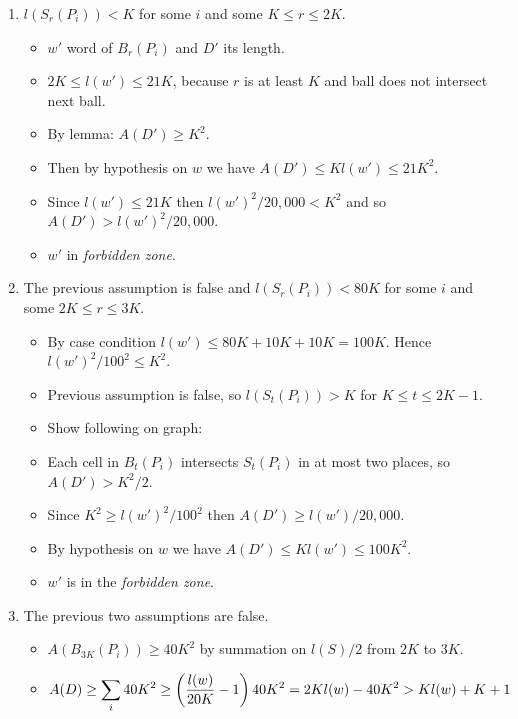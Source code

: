 \documentclass[11pt]{article} \usepackage{amssymb}
\begin{document}
\begin{enumerate}
\begin{itemize}
\begin{enumerate}
\begin{itemize}
          \begin{enumerate}
          \item $l(S_r(P_i))<K$ for some $i$ and some $K \leq r \leq 2K$. 
            \begin{itemize}
            \item $w'$ word of $B_r(P_i)$ and $D'$ its length.
            \item $2K\leq l(w') \leq 21K$, because $r$ is at least $K$ and 
              ball does not
              intersect next ball. 
            \item By lemma: $A(D')\geq K^2$.
            \item Then by hypothesis on $w$ we have 
              $A(D')\leq Kl(w')\leq 21K^2$.
            \item Since $l(w')\leq 21K$ then $l(w')^2/20,000<K^2$ and so
              $A(D')>l(w')^2/20,000$.
            \item $w'$ in {\em forbidden zone}.
            \end{itemize}
          \item  The previous assumption is false and 
            $l(S_r(P_i))<80K$ for some $i$ and some $2K \leq r \leq 3K$. 
            \begin{itemize}
            \item By case condition $l(w')\leq 80K+10K+10K=100K$. 
              Hence  $l(w')^2/100^2 \leq K^2$.
            \item Previous assumption is false, so $l(S_t(P_i))>K$ for 
              $K \leq t \leq 2K -1$.
            \item Show following on graph:
            \item Each cell in $B_t(P_i)$ intersects $S_t(P_i)$ in at most
              two places, so $A(D')>K^2/2$.
            \item Since $K^2\geq l(w')^2/100^2$ then $A(D') \geq l(w')/20,000$.
            \item By hypothesis on $w$ we have $A(D') \leq Kl(w') \leq 100K^2$.
            \item $w'$ is in the {\em forbidden zone}.
            \end{itemize}
          \item The previous two assumptions are false.
            \begin{itemize}
            \item $A(B_{3K}(P_i)) \geq 40K^2$ by summation on $l(S)/2$ from $2K$ to $3K$.
            \item 
              $$A(D)\geq \sum_i 40K^2\geq \left({l(w)\over 20K}-1\right)40K^2=2Kl(w)-40K^2>Kl(w)+K+1$$

\end{itemize}
\end{enumerate}
\end{itemize}
\end{enumerate}
\end{itemize}
\end{enumerate}
\end{document}
